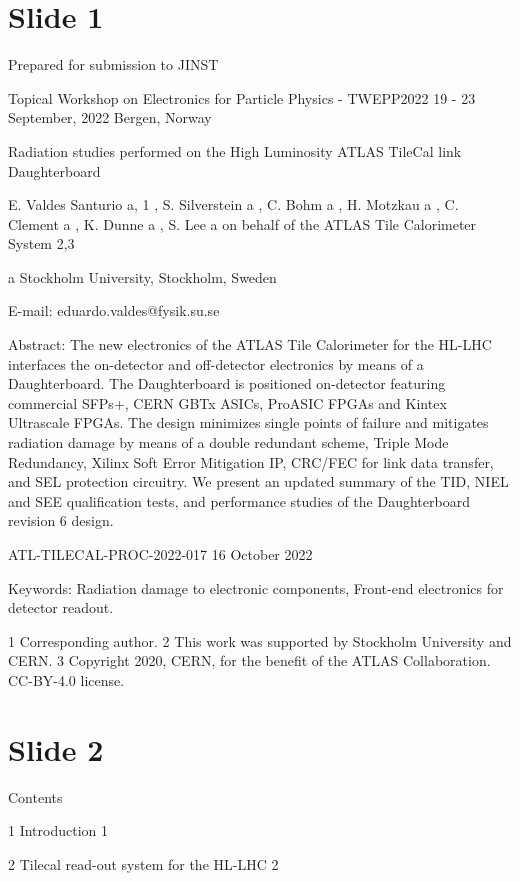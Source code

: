 \documentclass{article}
\begin{document}
\section*{Slide 1}

Prepared for submission to JINST

Topical Workshop on Electronics for Particle Physics - TWEPP2022 
19 - 23 September, 2022 
Bergen, Norway

Radiation studies performed on the High Luminosity 
ATLAS TileCal link Daughterboard

E. Valdes Santurio a, 1   , S. Silverstein a , C. Bohm a , H. Motzkau a , C. Clement a , K. 
Dunne a , S. Lee a on behalf of the ATLAS Tile Calorimeter System 2,3

a Stockholm University, Stockholm, Sweden

E-mail:   eduardo.valdes@fysik.su.se

Abstract:   The   new   electronics   of   the   ATLAS   Tile   Calorimeter   for   the   HL-LHC   interfaces   the 
on-detector   and   off-detector   electronics   by   means   of   a   Daughterboard. 
The   Daughterboard   is 
positioned   on-detector   featuring   commercial   SFPs+,   CERN   GBTx   ASICs,   ProASIC   FPGAs   and 
Kintex   Ultrascale   FPGAs.   The   design   minimizes   single   points   of   failure   and   mitigates   radiation 
damage   by   means   of   a   double   redundant   scheme,   Triple   Mode   Redundancy,   Xilinx   Soft   Error 
Mitigation   IP,   CRC/FEC   for   link   data   transfer,   and   SEL   protection   circuitry. 
We   present   an 
updated   summary   of   the   TID,   NIEL   and   SEE   qualification   tests,   and   performance   studies   of   the 
Daughterboard revision 6 design.

ATL-TILECAL-PROC-2022-017 
16 October 2022

Keywords:   Radiation damage to electronic components, Front-end electronics for detector readout.

1 Corresponding author. 
2 This work was supported by Stockholm University and CERN. 
3 Copyright 2020, CERN, for the benefit of the ATLAS Collaboration.   CC-BY-4.0 license.

\section*{Slide 2}

Contents

1 
Introduction 
1

2 
Tilecal read-out system for the HL-LHC 
2
\end{document}
